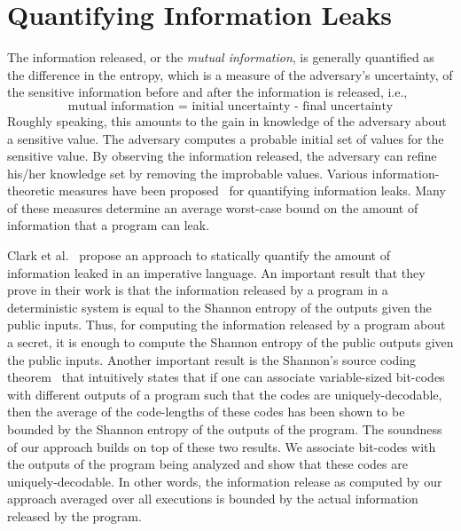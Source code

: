 \section{Quantifying Information Leaks}
\label{sec:bgqif}

The information released, or the \emph{mutual information}, is
generally quantified as the difference in the entropy, which is a
measure of the adversary's uncertainty, of the sensitive information 
before and after the information is released, i.e.,  
$$\text{mutual information = initial uncertainty - final
  uncertainty}$$ 
Roughly speaking, this amounts to the gain in knowledge of the
adversary about a sensitive value. The adversary computes a probable
initial set of values for the sensitive value. By observing the
information released, the adversary can refine his/her knowledge set
by removing the improbable values.
Various information-theoretic measures have been proposed~\cite{shannon, guessing, 
  smith2009, clarkson2009, csf12GLeakage} for quantifying information
leaks. Many of these measures determine an average worst-case bound on 
the amount of information that a program can leak. 

Clark et al.~\cite{clark} propose an approach to statically 
quantify the amount of information leaked in an imperative language.
An important result that they prove in their work is that the information 
released by a program in a deterministic system is equal to the Shannon 
entropy of the outputs given the public inputs. Thus, for computing the 
information released by a program about a secret, it is enough to compute
the Shannon entropy of the public outputs given the public inputs. 
Another important result is the Shannon's source coding 
theorem~\cite{shannon} that intuitively states that 
if one can associate variable-sized bit-codes with different outputs 
of a program such that the codes are uniquely-decodable, 
then the average of the code-lengths of these codes has been shown 
to be bounded by the Shannon entropy of the outputs of the program. 
The soundness of our approach builds on top of these two results. 
We associate bit-codes with the outputs of the program being analyzed 
and show that these codes are uniquely-decodable. In other words, 
the information release as computed by our approach averaged over 
all executions is bounded by the actual information released by the program.



